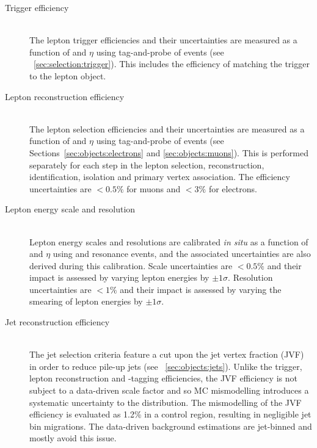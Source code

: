 \begin{description}
\item[Trigger efficiency] \hfill \\
	The lepton trigger efficiencies and their uncertainties are measured as a function of 
	\pt and $\eta$ using tag-and-probe of \HepProcess{\PZ \HepTo \Plepton\Plepton} events 
	(see \Section~\ref{sec:selection:trigger}). This includes the efficiency of matching the 
	trigger to the lepton object.
	
\item[Lepton reconstruction efficiency] \hfill \\
	The lepton selection efficiencies and their uncertainties are measured as a function of 
	\pt and $\eta$ using tag-and-probe of \HepProcess{\PZ \HepTo \Plepton\Plepton} events 
	(see Sections~\ref{sec:objects:electrons} and \ref{sec:objects:muons}). This is 
	performed separately for each step in the lepton selection, \ie reconstruction, 
	identification, isolation and primary vertex association. The efficiency uncertainties 
	are $<\!0.5\%$ for muons and $<\!3\%$ for electrons.
	
\item[Lepton energy scale and resolution] \hfill \\
	Lepton energy scales and resolutions are calibrated \textit{in situ} as a function of 
	\pt and $\eta$ using \HepProcess{\PJpsi \HepTo \Plepton\Plepton} and \HepProcess{\PZ 
	\HepTo \Plepton\Plepton} resonance events, and the associated uncertainties are also 
	derived during this calibration. Scale uncertainties are $<\!0.5\%$ and their impact 
	is assessed by varying lepton energies by $\pm1\sigma$. Resolution uncertainties are 
	$<\!1\%$ and their impact is assessed by varying the smearing of lepton energies by 
	$\pm1\sigma$.

\item[Jet reconstruction efficiency] \hfill \\
	The jet selection criteria feature a cut upon the jet vertex fraction (JVF) in order to 
	reduce pile-up jets (see \Section~\ref{sec:objects:jets}). Unlike the trigger, lepton 
	reconstruction and \Pbottom-tagging efficiencies, the JVF efficiency is not subject to 
	a data-driven scale factor and so MC mismodelling introduces a systematic uncertainty to 
	the \njets distribution. The mismodelling of the JVF efficiency is evaluated as 1.2\% in 
	a \DYll control region, resulting in negligible jet bin migrations. The data-driven 
	background estimations are jet-binned and mostly avoid this issue. 


\end{description}

